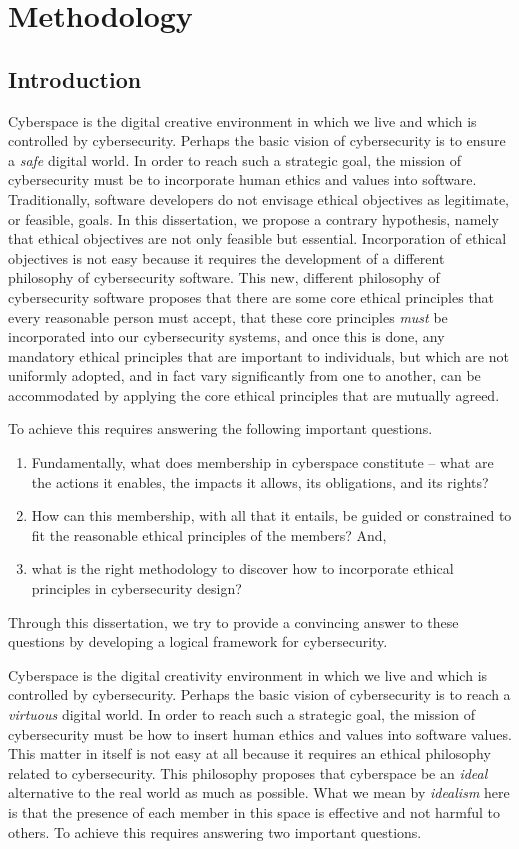 \chapter{Methodology}
\section{Introduction} 
Cyberspace is the digital creative environment in which we live and which is controlled by cybersecurity. Perhaps the basic vision of cybersecurity is to ensure a \emph{safe} digital world. In order to reach such a strategic goal, the mission of cybersecurity must be to incorporate human ethics and values into software. Traditionally, software developers do not envisage ethical objectives as legitimate, or feasible, goals. In this dissertation, we propose a contrary hypothesis, namely that ethical objectives are not only feasible but essential. Incorporation of ethical objectives is not easy because it requires the development of a different philosophy of cybersecurity software.  This new, different philosophy of cybersecurity software proposes that there are some core ethical principles that every reasonable person must accept, that these core principles \emph{must} be incorporated into our cybersecurity systems, and once this is done, any mandatory ethical principles that are important to individuals, but which are not uniformly adopted, and in fact vary significantly from one to another, can be accommodated by applying the core ethical principles that are mutually agreed.  

To achieve this requires answering the following  important questions.

\begin{enumerate}
\item Fundamentally, what does membership in cyberspace constitute -- what are the actions it enables, the impacts it allows, its obligations, and its rights?
\item How can this membership, with all that it entails, be guided or constrained to fit the reasonable ethical principles of the members? And,
\item what is the right methodology to discover how to incorporate ethical principles in cybersecurity design?
\end{enumerate}

Through this dissertation, we try to provide a convincing answer to these  questions by developing a logical framework for cybersecurity.

\iffalse
Cyberspace is the digital creativity environment in which we live and
which is controlled by cybersecurity.  Perhaps the basic vision of
cybersecurity is to reach a \emph{virtuous} digital world.  In order to
reach such a strategic goal, the mission of cybersecurity must be how
to insert human ethics and values into software values.  This matter
in itself is not easy at all because it requires an ethical philosophy
related to cybersecurity.  This philosophy proposes that cyberspace
be an \emph{ideal} alternative to the real world as much as possible.
What we mean by \emph{idealism} here is that the presence of each member
in this space is effective and not harmful to others.  To achieve this
requires answering two important questions.

